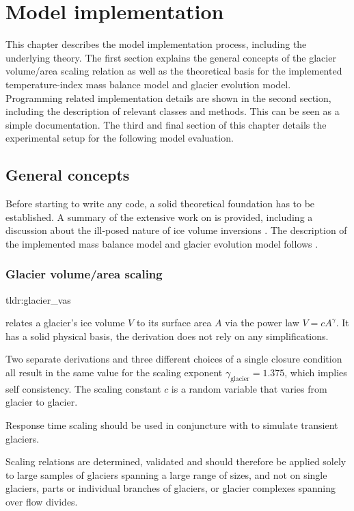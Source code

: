 \chapter{Model implementation}\label{chap:methods}
\thispagestyle{plain}

This chapter describes the model implementation process, including the underlying theory.
The first section explains the general concepts of the glacier volume/area scaling relation as well as the theoretical basis for the implemented temperature-index mass balance model and glacier evolution model. Programming related implementation details are shown in the second section, including the description of relevant classes and methods. This can be seen as a simple documentation. The third and final section of this chapter details the experimental setup for the following model evaluation.

\section{General concepts} %
\label{sec:general_concepts}

    Before starting to write any code, a solid theoretical foundation has to be established. A summary of the extensive work on \vas{} \citep{Bahr1997, Bahr1997a, Bahr1997b, Bahr2015} is provided,  including a discussion about the ill-posed nature of ice volume inversions \citep{Bahr2014}. The description of the implemented mass balance model and glacier evolution model follows \citet{Marzeion2012b}.

    \subsection{Glacier volume/area scaling} %
    \label{sub:glacier_volume_area_scaling}

        \begin{tldrbox}{tldr:glacier_vas}
            \item \Vas{} relates a glacier's ice volume $V$ to its surface area $A$ via the power law $V=cA^\gamma$. It has a solid physical basis, the derivation does not rely on any simplifications.
            \item Two separate derivations and three different choices of a single closure condition all result in the same value for the scaling exponent $\gamma_\text{glacier} = 1.375$, which implies self consistency. The scaling constant $c$ is a random variable that varies from glacier to glacier.
            \item Response time scaling should be used in conjuncture with \vas{} to simulate transient glaciers.
            \item Scaling relations are determined, validated and should therefore be applied solely to large samples of glaciers spanning a large range of sizes, and not on single glaciers, parts or individual branches of glaciers, or glacier complexes spanning over flow divides.
        \end{tldrbox}

